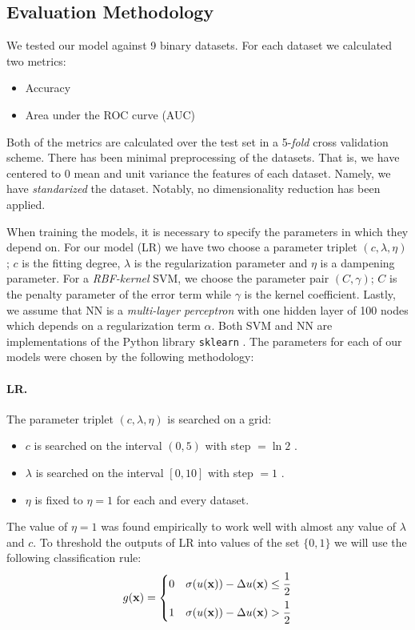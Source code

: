 \documentclass{INGUADY}
\begin{document}
\begin{body}
\section{Evaluation Methodology}
We tested our model against 9 binary datasets. For each dataset we calculated two metrics:
\begin{itemize}
\item Accuracy
\item Area under the ROC curve (AUC) \cite{hanleyroc}
\end{itemize}
Both of the metrics are calculated over the test set in a 5-\textit{fold} cross validation scheme. There has been minimal preprocessing of the datasets. That is, we have centered to 0 mean and unit variance the features of each dataset. Namely, we have \textit{standarized} the dataset. Notably, no dimensionality reduction has been applied. 

When training the models, it is necessary to specify the parameters in which they depend on. For our model (LR) we have two choose a parameter triplet $(c, \lambda, \eta)$; $c$ is the fitting degree, $\lambda$ is the regularization parameter and $\eta$ is a dampening parameter. For a \textit{RBF-kernel} SVM, we choose the parameter pair $(C, \gamma)$; $C$ is the penalty parameter of the error term while $\gamma$ is the kernel coefficient. Lastly, we assume that NN is a \textit{multi-layer perceptron} with one hidden layer of 100 nodes which depends on a  regularization term $\alpha$. Both SVM and NN are implementations of the Python library \texttt{sklearn} \cite{sklearn}. The parameters for each of our models were chosen by the following methodology:
\paragraph{\textbf{LR.}}
The parameter triplet $(c, \lambda, \eta)$ is searched on a grid:
\begin{itemize}
\item $c$ is searched on the interval $(0, 5)$ with step $ = \ln 2$ .
 \item $\lambda$ is searched on the interval $[0, 10]$ with step $= 1$ .
 \item $\eta$ is fixed to $\eta = 1$ for each and every dataset.
\end{itemize}
The value of $\eta = 1$ was found empirically to work well with almost any value of $\lambda$ and $c$. To threshold the outputs of LR into values of the set $\{ 0, 1\}$ we will use the following classification rule:
\begin{equation*}
g(\mathbf{x}) = \begin{cases}
0 & \sigma(u(\mathbf{x})) - \Delta u(\mathbf{x}) \leq \dfrac{1}{2} \vspace{2mm} \\
1 & \sigma(u(\mathbf{x})) - \Delta u(\mathbf{x}) > \dfrac{1}{2}
\end{cases}
\end{equation*}


\end{body}
\end{document}

